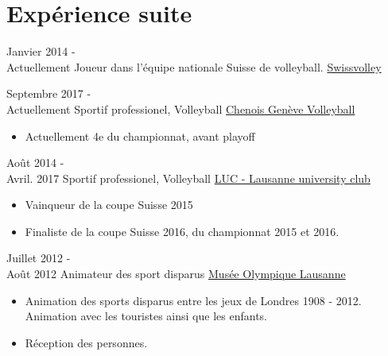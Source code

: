 \documentclass[letterpaper]{twentysecondcv} %
\begin{document}
	\section{Expérience suite}
	\begin{twenty}
		
		\twentyitem
		{Janvier 2014 - \\ Actuellement}
		{Joueur dans l'équipe nationale Suisse de volleyball.}
		{\href{http://swissvolley.ch/}{Swissvolley}}
		{}
		{{}
		}
		
		\twentyitem
		{Septembre 2017 - \\ Actuellement}
		{Sportif professionel, Volleyball}
		{\href{http://chenoisvolley.ch/}{Chenois Genève Volleyball}}
		{}
		{{
				\begin{itemize}
					\item Actuellement 4e du championnat, avant playoff
			\end{itemize}}
		}
		
		\twentyitem
		{Août 2014 - \\ Avril. 2017}
		{Sportif professionel, Volleyball}
		{\href{https://www.lucvolleyball.ch}{LUC - Lausanne university club}}
		{}
		{{
				\begin{itemize}
					\item Vainqueur de la coupe Suisse 2015
					\item Finaliste de la coupe Suisse 2016, du championnat 2015 et 2016.
			\end{itemize}}
		}
		
		\twentyitem
		{Juillet 2012 - \\ Août 2012}
		{Animateur des sport disparus}
		{\href{www.olympic.org/fr/musee}{Musée Olympique Lausanne}}
		{}
		{
			{\begin{itemize}
					\item Animation des sports disparus entre les jeux de Londres 1908 - 2012. Animation avec les touristes ainsi que les enfants.
					\item Réception des personnes.
			\end{itemize}}
		}
		
		
		
		
		
	\end{twenty}
	
\end{document}
